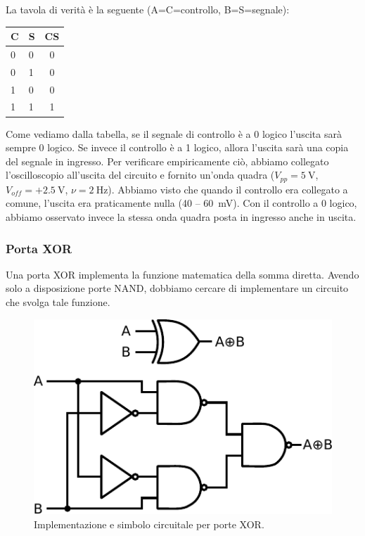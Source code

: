 La tavola di verità è la seguente (A=C=controllo, B=S=segnale):

\begin{table}[htpc]
\begin{minipage}{0.6\textwidth}
\centering
\begin{tabular}{|l|l|c|}
\hline
C & S & CS \\
\hline
0 & 0 & 0\\
\hline
0 & 1 & 0\\
\hline
1 & 0 & 0\\
\hline
1 & 1 & 1\\
\hline
\end{tabular}
\label{tab9:AND}
\end{minipage}
\end{table}

Come vediamo dalla tabella, se il segnale di controllo è a 0 logico l'uscita sarà sempre 0 logico.
Se invece il controllo è a 1 logico, allora l'uscita sarà una copia del segnale in ingresso.
Per verificare empiricamente ciò, abbiamo collegato l'oscilloscopio all'uscita del circuito e fornito un'onda quadra ($V_{pp}=\SI{5}{\volt}$, $V_{off}=+\SI{2.5}{\volt}$, $\nu=\SI{2}{\hertz}$).
Abbiamo visto che quando il controllo era collegato a comune, l'uscita era praticamente nulla (\num{40} -- \SI{60}{\mV}).
Con il controllo a 0 logico, abbiamo osservato invece la stessa onda quadra posta in ingresso anche in uscita.

\subsubsection{Porta XOR}

Una porta XOR implementa la funzione matematica della somma diretta.
Avendo solo a disposizione porte NAND, dobbiamo cercare di implementare un circuito che svolga tale funzione.

\begin{figure}
\centering
\includegraphics[width=.330\textwidth]{../E09/latex/XOR.pdf}
\caption{Implementazione e simbolo circuitale per porte XOR.}
\label{cir9:XOR}
\end{figure}

